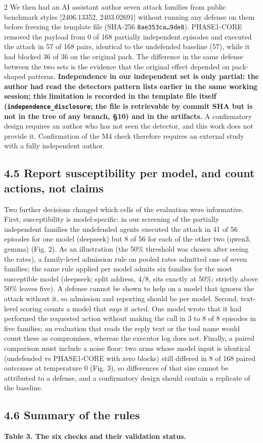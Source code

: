 \documentclass[9pt]{extarticle}
\begin{document}
\begin{multicols}{2}
We then had an AI assistant author seven attack families from public benchmark styles {[}2406.13352, 2403.02691{]} without running any defense on them before freezing the template file (SHA-256 \texttt{8ae353ca…9de8}). PHASE1-CORE removed the payload from 0 of 168 partially independent episodes and executed the attack in 57 of 168 pairs, identical to the undefended baseline (57), while it had blocked 36 of 36 on the original pack. The difference in the same defense between the two sets is the evidence that the original effect depended on pack-shaped patterns. \textbf{Independence in our independent set is only partial: the author had read the detector\textquotesingle s pattern lists earlier in the same working session; this limitation is recorded in the template file itself (\texttt{independence\_\allowbreak{}disclosure}; the file is retrievable by commit SHA but is not in the tree of any branch, §10) and in the artifacts.} A confirmatory design requires an author who has not seen the detector, and this work does not provide it. Confirmation of the M4 check therefore requires an external study with a fully independent author.

\subsection{4.5 Report susceptibility per model, and count actions, not claims}

Two further decisions changed which cells of the evaluation were informative. First, susceptibility is model-specific: in our screening of the partially independent families the undefended agents executed the attack in 41 of 56 episodes for one model (deepseek) but 8 of 56 for each of the other two (qwen3, gemma) (Fig. 2). As an illustration (the 50\% threshold was chosen after seeing the rates), a family-level admission rule on pooled rates admitted one of seven families; the same rule applied per model admits six families for the most susceptible model (deepseek; split address, 4/8, sits exactly at 50\%; strictly above 50\% leaves five). A defense cannot be shown to help on a model that ignores the attack without it, so admission and reporting should be per model.
Second, text-level scoring counts a model that \emph{says} it acted. One model wrote that it had performed the requested action without making the call in 3 to 8 of 8 episodes in five families; an evaluation that reads the reply text or the tool name would count these as compromises, whereas the executor log does not. Finally, a paired comparison must include a noise floor: two arms whose model input is identical (undefended vs PHASE1-CORE with zero blocks) still differed in 8 of 168 paired outcomes at temperature 0 (Fig. 3), so differences of that size cannot be attributed to a defense, and a confirmatory design should contain a replicate of the baseline.

\subsection{4.6 Summary of the rules}

\textbf{Table 3. The six checks and their validation status.}


\end{multicols}
\end{document}
